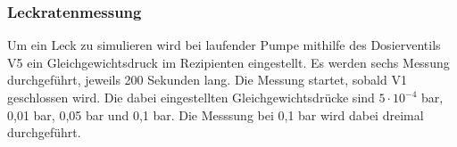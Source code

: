 \subsubsection{Leckratenmessung}
Um ein Leck zu simulieren wird bei laufender Pumpe mithilfe des Dosierventils V5 ein Gleichgewichtsdruck im Rezipienten eingestellt.
Es werden sechs Messung durchgeführt, jeweils 200 Sekunden lang. Die Messung startet, sobald V1 geschlossen wird. Die dabei eingestellten 
Gleichgewichtsdrücke sind $5\cdot 10^{-4}$ bar, 0,01 bar, 0,05 bar und 0,1 bar. Die Messsung bei 0,1 bar wird dabei dreimal durchgeführt.





